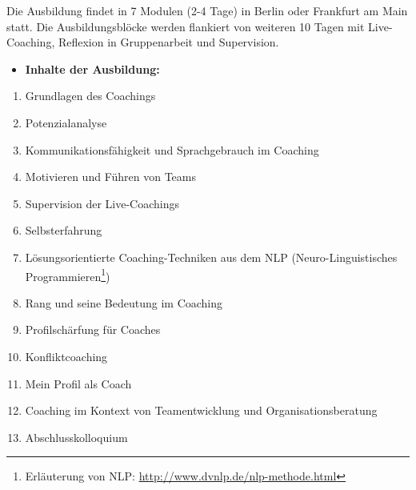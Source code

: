 \documentclass[11pt,a4paper]{article}
\begin{document}
\begin{itemize}
Die Ausbildung findet in 7 Modulen (2-4 Tage) in Berlin oder Frankfurt am Main statt. Die Ausbildungsblöcke werden flankiert von weiteren 10 Tagen mit Live-Coaching, Reflexion in Gruppenarbeit und Supervision.

	\begin{itemize}
	\item \textbf{Inhalte der Ausbildung:}
	\end{itemize}
	
			\begin{enumerate}
			\item Grundlagen des Coachings
			\item Potenzialanalyse
			\item Kommunikationsfähigkeit und Sprachgebrauch im Coaching
			\item Motivieren und Führen von Teams
			\item Supervision der Live-Coachings
			\item Selbsterfahrung
			\item Lösungsorientierte Coaching-Techniken aus dem NLP (Neuro-Linguistisches Programmieren\footnote{Erläuterung von NLP: \textsf{\textcolor{MidnightBlue}{\url{http://www.dvnlp.de/nlp-methode.html}}}})
			\item Rang und seine Bedeutung im Coaching
			\item Profilschärfung für Coaches
			\item Konfliktcoaching
			\item Mein Profil als Coach
			\item Coaching im Kontext von Teamentwicklung und Organisationsberatung
			\item Abschlusskolloquium
			\end{enumerate}


\end{itemize}
\end{document}
